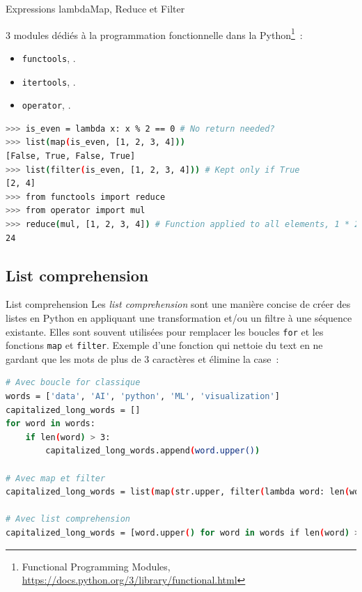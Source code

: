 \documentclass{beamer}
\begin{document}
    \begin{frame}[fragile]{Expressions lambda}{Map, Reduce et Filter}
        \begin{footnotesize}
            3 modules dédiés à la programmation fonctionnelle dans la  Python\footnote{Functional Programming Modules, \url{https://docs.python.org/3/library/functional.html}}~:
            \begin{itemize}
                \item \lstinline{functools}, .
                \item \lstinline{itertools}, .
                \item \lstinline{operator}, .
            \end{itemize}
            \begin{lstlisting}[language=bash]
>>> is_even = lambda x: x % 2 == 0 # No return needed?
>>> list(map(is_even, [1, 2, 3, 4]))
[False, True, False, True]
>>> list(filter(is_even, [1, 2, 3, 4])) # Kept only if True
[2, 4]
>>> from functools import reduce
>>> from operator import mul
>>> reduce(mul, [1, 2, 3, 4]) # Function applied to all elements, 1 * 2 * 3 * 4
24
            \end{lstlisting}
        \end{footnotesize}
    \end{frame}

    \subsection{List comprehension}

    \begin{frame}[fragile]{List comprehension}
        Les \textit{list comprehension} sont une manière concise de créer des listes en Python en appliquant une transformation et/ou un filtre à une séquence existante.
        Elles sont souvent utilisées pour remplacer les boucles \lstinline{for} et les fonctions \lstinline{map} et \lstinline{filter}.
        \bigbreak
        Exemple d'une fonction qui nettoie du text en ne gardant que les mots de plus de 3 caractères et élimine la case~:
        \begin{lstlisting}[language=bash,basicstyle=\tiny\ttfamily]
# Avec boucle for classique
words = ['data', 'AI', 'python', 'ML', 'visualization']
capitalized_long_words = []
for word in words:
    if len(word) > 3:
        capitalized_long_words.append(word.upper())

# Avec map et filter
capitalized_long_words = list(map(str.upper, filter(lambda word: len(word) > 3, words)))

# Avec list comprehension
capitalized_long_words = [word.upper() for word in words if len(word) > 3]
        \end{lstlisting}
    \end{frame}
\end{document}
